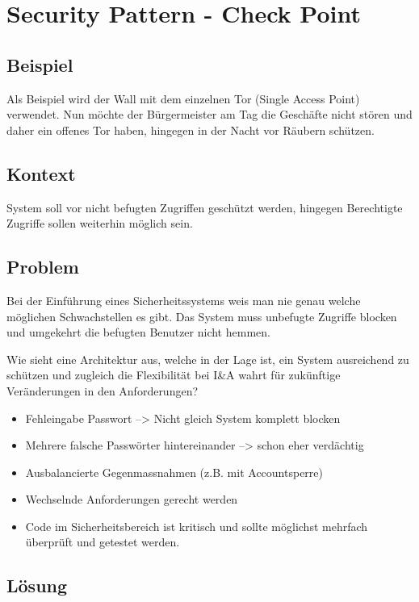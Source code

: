 \section{Security Pattern - Check Point}


\subsection*{Beispiel}

Als Beispiel wird der Wall mit dem einzelnen Tor (Single Access Point) verwendet. Nun möchte der Bürgermeister am Tag die Geschäfte nicht stören und daher ein offenes Tor haben, hingegen in der Nacht vor Räubern schützen.

\subsection*{Kontext}

System soll vor nicht befugten Zugriffen geschützt werden, hingegen Berechtigte Zugriffe sollen weiterhin möglich sein.

\subsection*{Problem}

Bei der Einführung eines Sicherheitssystems weis man nie genau welche möglichen Schwachstellen es gibt. Das System muss unbefugte Zugriffe blocken und umgekehrt die befugten Benutzer nicht hemmen.

Wie sieht eine Architektur aus, welche in der Lage ist, ein System ausreichend zu schützen und zugleich die Flexibilität bei I\&A wahrt für zukünftige Veränderungen in den Anforderungen?

\begin{itemize}
	\item Fehleingabe Passwort --> Nicht gleich System komplett blocken
	\item Mehrere falsche Passwörter hintereinander --> schon eher verdächtig
	\item Ausbalancierte Gegenmassnahmen (z.B. mit Accountsperre)
	\item Wechselnde Anforderungen gerecht werden
	\item Code im Sicherheitsbereich ist kritisch und sollte möglichst mehrfach überprüft und getestet werden.
\end{itemize}

\subsection*{Lösung}

